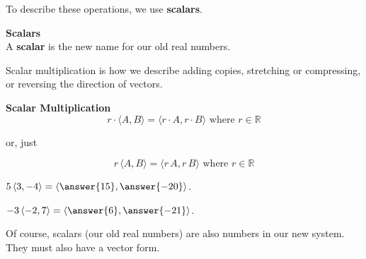 \documentclass{ximera}
\begin{document}
To describe these operations, we use \textbf{scalars}.


\begin{definition}  \textbf{\textcolor{green!50!black}{Scalars}}  \\

A \textbf{scalar} is the new name for our old real numbers. 

\end{definition}


Scalar multiplication is how we describe adding copies, stretching or compressing, or reversing the direction of vectors.


\begin{definition}  \textbf{\textcolor{green!50!black}{Scalar Multiplication}}  \\

\[    r \cdot \langle A, B \rangle  = \langle r \cdot A, r \cdot B \rangle   \text{ where }  r \in \mathbb{R}   \]

or, just

\[    r \, \langle A, B \rangle  = \langle r \, A, r \, B \rangle   \text{ where }  r \in \mathbb{R}   \]

\end{definition}









\begin{question} 


$5 \, \langle 3, -4 \rangle  = \left\langle \answer{15}, \answer{-20} \right\rangle$.



\end{question}









\begin{question} 


$-3 \, \langle -2, 7 \rangle  = \left\langle \answer{6}, \answer{-21} \right\rangle$.



\end{question}







Of course, scalars (our old real numbers) are also numbers in our new system.  They must also have a vector form. \\
\end{document}
